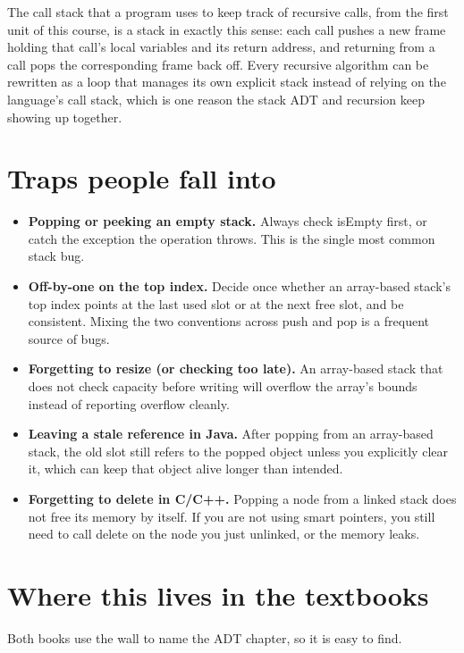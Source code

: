 \documentclass[11pt]{article}
\begin{document}
The call stack that a program uses to keep track of recursive calls, from the first unit
of this course, is a stack in exactly this sense: each call pushes a new frame holding that
call's local variables and its return address, and returning from a call pops the
corresponding frame back off. Every recursive algorithm can be rewritten as a loop that
manages its own explicit stack instead of relying on the language's call stack, which is
one reason the stack ADT and recursion keep showing up together.

\section{Traps people fall into}

\begin{itemize}[leftmargin=1.4em]
  \item \textbf{Popping or peeking an empty stack.} Always check isEmpty first, or catch
    the exception the operation throws. This is the single most common stack bug.
  \item \textbf{Off-by-one on the top index.} Decide once whether an array-based stack's
    top index points at the last used slot or at the next free slot, and be consistent.
    Mixing the two conventions across push and pop is a frequent source of bugs.
  \item \textbf{Forgetting to resize (or checking too late).} An array-based stack that
    does not check capacity before writing will overflow the array's bounds instead of
    reporting overflow cleanly.
  \item \textbf{Leaving a stale reference in Java.} After popping from an array-based
    stack, the old slot still refers to the popped object unless you explicitly clear it,
    which can keep that object alive longer than intended.
  \item \textbf{Forgetting to delete in C/C++.} Popping a node from a linked stack does not
    free its memory by itself. If you are not using smart pointers, you still need to call
    delete on the node you just unlinked, or the memory leaks.
\end{itemize}

\section{Where this lives in the textbooks}

Both books use the wall to name the ADT chapter, so it is easy to find.
\end{document}
